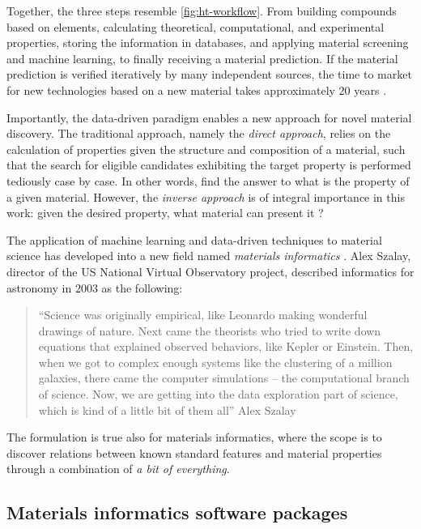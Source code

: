 Together, the three steps resemble \autoref{fig:ht-workflow}. From building compounds based on elements, calculating theoretical, computational, and experimental properties, storing the information in databases, and applying material screening and machine learning, to finally receiving a material prediction. If the material prediction is verified iteratively by many independent sources, the time to market for new technologies based on a new material takes approximately $20$ years \cite{Eagar1995, Schleder2019}.

\noindent Importantly, the data-driven paradigm enables a new approach for novel material discovery. The traditional approach, namely the \textit{direct approach}, relies on the calculation of properties given the structure and composition of a material, such that the search for eligible candidates exhibiting the target property is performed tediously case by case. In other words, find the answer to what is the property of a given material. However, the \textit{inverse approach} is of integral importance in this work: given the desired property, what material can present it \cite{Schleder2019}?

The application of machine learning and data-driven techniques to material science has developed into a new field named \textit{materials informatics} \cite{Rajan2005}. Alex Szalay, director of the US National Virtual Observatory project, described informatics for astronomy in $2003$ as the following:
\begin{quote}
   ``Science was originally empirical, like Leonardo making wonderful drawings of nature. Next came the theorists who tried to write down equations that explained observed behaviors, like Kepler or Einstein. Then, when we got to complex enough systems like the clustering of a million galaxies, there came the computer simulations – the computational branch of science. Now, we are getting into the data exploration part of science, which is kind of a little bit of them all'' Alex Szalay \cite{Szalay2003}
\end{quote}
\noindent The formulation is true also for materials informatics, where the scope is to discover relations between known standard features and material properties through a combination of \emph{a bit of everything}.

\subsection{Materials informatics software packages}


